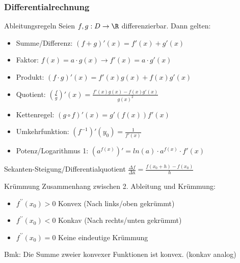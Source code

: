\raggedcolumns



\subsubsection{Differentialrechnung}

\begin{concept}{Ableitungsregeln}
    Seien $f,g: D \to \R$  differenzierbar. Dann gelten:
    \begin{itemize}
        \item Summe/Differenz: $(f + g)'(x) = f'(x) + g'(x)$
        \item Faktor: $f(x)=a\cdot g(x) \rightarrow f'(x)=a \cdot g'(x) $
        \item Produkt: $(f \cdot g)'(x) = f'(x)g(x) + f(x)g'(x)$
        \item Quotient: $(\frac{f}{g})'(x) = \frac{f'(x) g(x) - f(x) g'(x)}{g(x)^2}$
        \item Kettenregel: $(g \circ f)' (x) = g'(f(x)) f'(x)$
        \item Umkehrfunktion: $(f^{-1})'(y_0) = \frac{1}{f'(x)}$
        \item Potenz/Logarithmus 1: 
        $(a^{f(x)})' = ln(a) \cdot a^{f(x)} \cdot f'(x)$

    \end{itemize}
\end{concept}

\begin{theorem}{Sekanten-Steigung/Differentialquotient}
    $\frac{\Delta f}{\Delta \mathrm{x}}=\frac{f(x_{0}+h)-f(x_{0})}{h}$
\end{theorem}


\begin{corollary}{Krümmung}
    Zusammenhang zwischen 2. Ableitung und Krümmung:
    \begin{itemize}
      \item $f^{\prime \prime}(x_{0})>0$ Konvex (Nach links/oben gekrümmt)
      \item $f^{\prime \prime}(x_{0})<0$ Konkav (Nach rechts/unten gekrümmt)
      \item $f^{\prime \prime}(x_{0})=0$ Keine eindeutige Krümmung
    \end{itemize}
    Bmk: Die Summe zweier konvexer Funktionen ist konvex. (konkav analog)
\end{corollary}

